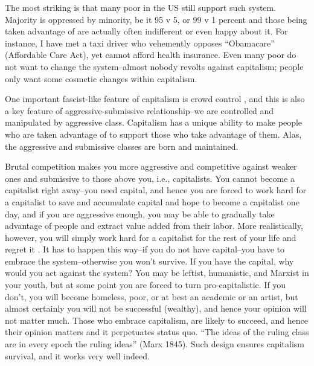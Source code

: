 \documentclass[11pt, letterpaper]{article}
\begin{document}
\begin{spacing}{2.0}
The most striking is that many poor in the US still support such system.  Majority is oppressed by minority, be it 95 v 5, or 99 v 1 percent%
and those being taken advantage of are actually often indifferent or even happy
about it.
For instance, 
 I have met a taxi driver who vehemently opposes ``Obamacare'' (Affordable Care Act), yet cannot afford health insurance. 
Even many poor do not want to change the system--almost nobody revolts against capitalism;  people only want some cosmetic changes
within capitalism. %


One important fascist-like feature of capitalism is
crowd control \citep{kunstler12}, %
 and this is also a key feature of aggressive-submissive relationship--we are
 controlled and manipulated by aggressive class.  
%
Capitalism has a unique ability to make people who are taken advantage of to
support those who take advantage of them. Alas, the aggressive and submissive
classes are born and maintained. 

Brutal competition makes you more aggressive
and competitive against weaker ones and submissive to those above you, i.e.,
capitalists. You cannot become a capitalist right away--you need capital, and
hence you are forced to work hard for a capitalist to save and accumulate
capital and hope to become a capitalist one day, and if you are aggressive
enough, you may be able to gradually take advantage of people and extract value
added from their labor. More realistically, however, you will simply work hard
for a capitalist for the rest of your life and regret it \cite{ware12}. It has to happen this way--if you do
not have capital--you have to embrace the system--otherwise you won't
survive. If you have the capital, why would you act against the system?
You may be leftist, humanistic, and Marxist in your youth, but at some point you
 are forced to turn pro-capitalistic. If you don't, you will
 become  homeless, poor, or at best an academic or an artist, but almost
 certainly you will not be successful (wealthy), and hence your opinion will not
 matter much. Those who embrace capitalism, are likely to succeed, and hence
 their opinion matters and it perpetuates status quo.
 ``The ideas of the ruling
 class are in every epoch the ruling ideas'' (Marx 1845).
 Such design ensures capitalism survival, and it works very well indeed. 


\end{spacing}
\end{document}
